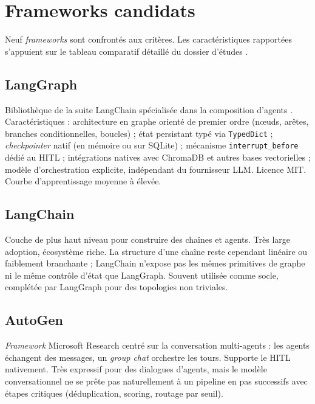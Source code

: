 \section{Frameworks candidats}
\label{sec:candidats}

Neuf \emph{frameworks} sont confrontés aux critères. Les caractéristiques rapportées s'appuient sur le tableau comparatif détaillé du dossier d'études \cite{vaidhyanathan_taibi}.

\subsection{LangGraph}

Bibliothèque de la suite LangChain spécialisée dans la composition d'agents \cite{langgraph}. Caractéristiques : architecture en graphe orienté de premier ordre (nœuds, arêtes, branches conditionnelles, boucles) ; état persistant typé via \texttt{TypedDict} ; \emph{checkpointer} natif (en mémoire ou sur SQLite) ; mécanisme \texttt{interrupt\_before} dédié au HITL ; intégrations natives avec ChromaDB et autres bases vectorielles ; modèle d'orchestration explicite, indépendant du fournisseur LLM. Licence MIT. Courbe d'apprentissage moyenne à élevée.

\subsection{LangChain}

Couche de plus haut niveau \cite{langchain} pour construire des chaînes et agents. Très large adoption, écosystème riche. La structure d'une chaîne reste cependant linéaire ou faiblement branchante ; LangChain n'expose pas les mêmes primitives de graphe ni le même contrôle d'état que LangGraph. Souvent utilisée comme socle, complétée par LangGraph pour des topologies non triviales.

\subsection{AutoGen}

\emph{Framework} Microsoft Research \cite{autogen} centré sur la conversation multi-agents : les agents échangent des messages, un \emph{group chat} orchestre les tours. Supporte le HITL nativement. Très expressif pour des dialogues d'agents, mais le modèle conversationnel ne se prête pas naturellement à un pipeline en pas successifs avec étapes critiques (déduplication, scoring, routage par seuil).

